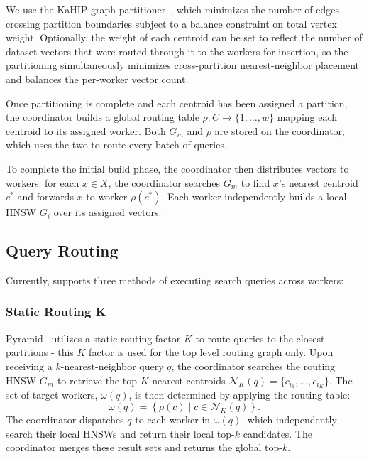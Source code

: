 \documentclass[sigconf,review,anonymous]{acmart}
\begin{document}
    We use the KaHIP graph partitioner~\cite{sandersschulz2013kahip}, which minimizes the number of edges crossing partition boundaries subject to a balance constraint on total vertex weight. Optionally, the weight of each centroid can be set to reflect the number of dataset vectors that were routed through it to the workers for insertion, so the partitioning simultaneously minimizes cross-partition nearest-neighbor placement and balances the per-worker vector count. 
    
    Once partitioning is complete and each centroid has been assigned a partition, the coordinator builds a global routing table $\rho: C \rightarrow \{1, \ldots, w\}$ mapping each centroid to its assigned worker. Both $G_m$ and $\rho$ are stored on the coordinator, which uses the two to route every batch of queries.
    
    To complete the initial build phase, the coordinator then distributes vectors to workers: for each $x \in X$, the coordinator searches $G_m$ to find $x$'s nearest centroid $c^*$ and forwards $x$ to worker $\rho(c^*)$. Each worker independently builds a local HNSW $G_i$ over its assigned vectors.
    
\subsection{Query Routing}
    Currently, \SystemName{} supports three methods of executing search queries across workers: 

\subsubsection{Static Routing K}
    Pyramid~\cite{deng2019pyramid} utilizes a static routing factor $K$ to route queries to the closest partitions - this $K$ factor is used for the top level routing graph only. Upon receiving a $k$-nearest-neighbor query $q$, the coordinator searches the routing HNSW $G_m$ to retrieve the top-$K$ nearest centroids $\mathcal{N}_K(q) = \{c_{i_1}, \ldots, c_{i_K}\}$. The set of target workers, $\omega(q)$,  is then determined by applying the routing table:
    \[
      \omega(q) = \left\{ \rho(c) \mid c \in \mathcal{N}_K(q) \right\}.
    \]
    The coordinator dispatches $q$ to each worker in $\omega(q)$, which independently search their local HNSWs and return their local top-$k$ candidates. The coordinator merges these result sets and returns the global top-$k$.
\end{document}
